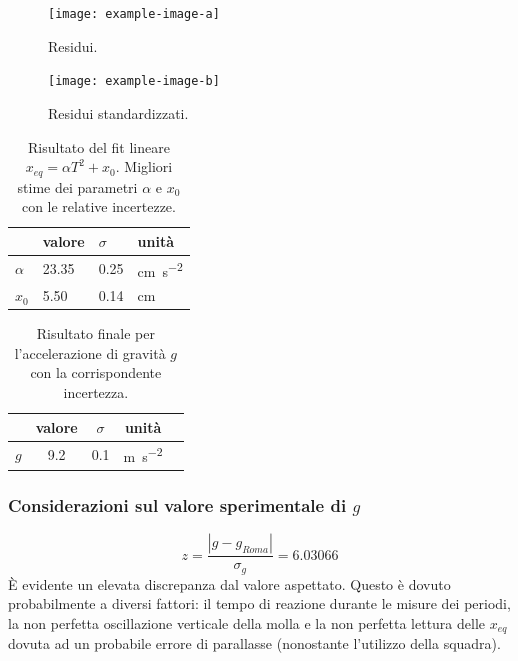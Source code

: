 \documentclass[titlepage]{article}
\numberwithin{equation}{section}
\numberwithin{figure}{section}
\numberwithin{table}{section}
\begin{document}
\begin{figure}[ht]
  \centering
  \begin{minipage}{0.5 \textwidth}
    \texttt{[image: example-image-a]}
    \caption{Residui.}
  \end{minipage}%
  \begin{minipage}{0.5 \textwidth}
    \texttt{[image: example-image-b]}
    \caption{Residui standardizzati.}
  \end{minipage}
\end{figure}

\begin{table}[ht]
  \centering
  \begin{tabular}{llll}
    \toprule
    & valore & $\sigma$ & unità \\
    \midrule
    $\alpha$ & 23.35 & 0.25 & \si{\centi\metre\per\second\squared} \\
    $x_0$    & 5.50  & 0.14 & \si{\centi\metre} \\
    \bottomrule
  \end{tabular}
  \caption{Risultato del fit lineare $x_{eq} = \alpha T^2 + x_0$. Migliori stime dei parametri $\alpha$ e $x_0$ con le relative incertezze.}
\end{table}

\pagebreak

\begin{table}[ht]
  \centering
  \begin{tabular}{rcccc}
    \toprule
    & valore & $\sigma$ & unità \\
    \midrule
    $g$ & 9.2 & 0.1 & \si{\metre\per\second\squared} \\
    \bottomrule
  \end{tabular}
  \caption{Risultato finale per l'accelerazione di gravità $g$ con la corrispondente incertezza.}
\end{table}

\subsubsection{Considerazioni sul valore sperimentale di \texorpdfstring{$g$}{g}}

\begin{equation*}
  z = \frac{|g - g_{Roma}|}{\sigma_g} = 6.03066
\end{equation*}
È evidente un elevata discrepanza dal valore aspettato. Questo è dovuto probabilmente a diversi fattori: il tempo di reazione durante le misure dei periodi, la non perfetta oscillazione verticale della molla e la non perfetta lettura delle $x_{eq}$ dovuta ad un probabile errore di parallasse (nonostante l'utilizzo della squadra).
\end{document}
